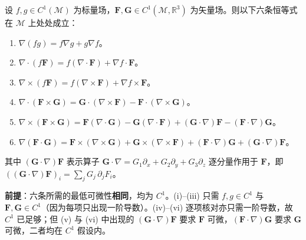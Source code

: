 \begin{theorem}[梯度、散度、旋度的乘积法则]\label{thm:product_rules}
设 $f, g \in C^1(\mathcal{M})$ 为标量场，$\mathbf{F}, \mathbf{G} \in C^1(\mathcal{M}, \mathbb{R}^3)$ 为矢量场。则以下六条恒等式在 $\mathcal{M}$ 上处处成立：
\begin{enumerate}[label=(\roman*)]
    \item $\nabla(fg) = f\nabla g + g\nabla f$。
    \item $\nabla \cdot (f\mathbf{F}) = f(\nabla \cdot \mathbf{F}) + \nabla f \cdot \mathbf{F}$。
    \item $\nabla \times (f\mathbf{F}) = f(\nabla \times \mathbf{F}) + \nabla f \times \mathbf{F}$。
    \item $\nabla \cdot (\mathbf{F} \times \mathbf{G}) = \mathbf{G} \cdot (\nabla \times \mathbf{F}) - \mathbf{F} \cdot (\nabla \times \mathbf{G})$。
    \item $\nabla \times (\mathbf{F} \times \mathbf{G}) = \mathbf{F}(\nabla \cdot \mathbf{G}) - \mathbf{G}(\nabla \cdot \mathbf{F}) + (\mathbf{G} \cdot \nabla)\mathbf{F} - (\mathbf{F} \cdot \nabla)\mathbf{G}$。
    \item $\nabla(\mathbf{F} \cdot \mathbf{G}) = \mathbf{F} \times (\nabla \times \mathbf{G}) + \mathbf{G} \times (\nabla \times \mathbf{F}) + (\mathbf{F} \cdot \nabla)\mathbf{G} + (\mathbf{G} \cdot \nabla)\mathbf{F}$。
\end{enumerate}
其中 $(\mathbf{G} \cdot \nabla)\mathbf{F}$ 表示算子 $\mathbf{G} \cdot \nabla = G_1\partial_x + G_2\partial_y + G_3\partial_z$ 逐分量作用于 $\mathbf{F}$，即 $((\mathbf G\cdot\nabla)\mathbf F)_i = \sum_{j}G_j\,\partial_jF_i$。

\textbf{前提}：六条所需的最低可微性\textbf{相同}，均为 $C^1$。(i)--(iii) 只需 $f,g\in C^1$ 与 $\mathbf F,\mathbf G\in C^1$（因为每项只出现一阶导数）。(iv)--(vi) 逐项核对亦只需一阶导数，故 $C^1$ 已足够；但 (v) 与 (vi) 中出现的 $(\mathbf G\cdot\nabla)\mathbf F$ 要求 $\mathbf F$ 可微，$(\mathbf F\cdot\nabla)\mathbf G$ 要求 $\mathbf G$ 可微，二者均在 $C^1$ 假设内。
\end{theorem}

